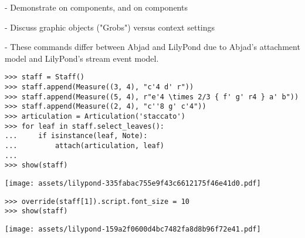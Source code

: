 -   Demonstrate on components, and on components

-   Discuss graphic objects ("Grobs") versus context settings

-   These commands differ between Abjad and LilyPond due to Abjad's attachment
    model and LilyPond's stream event model.

\begin{comment}
<abjad>
staff = Staff()
staff.append(Measure((3, 4), "c'4 d' r"))
staff.append(Measure((5, 4), r"e'4 \times 2/3 { f' g' r4 } a' b"))
staff.append(Measure((2, 4), "c''8 g' c'4"))
articulation = Articulation('staccato')
for leaf in staff.select_leaves():
    if isinstance(leaf, Note):
        attach(articulation, leaf)

show(staff)
</abjad>
\end{comment}

\begin{abjadbookoutput}
\begin{singlespacing}
\vspace{-0.5\baselineskip}
\begin{lstlisting}
>>> staff = Staff()
>>> staff.append(Measure((3, 4), "c'4 d' r"))
>>> staff.append(Measure((5, 4), r"e'4 \times 2/3 { f' g' r4 } a' b"))
>>> staff.append(Measure((2, 4), "c''8 g' c'4"))
>>> articulation = Articulation('staccato')
>>> for leaf in staff.select_leaves():
...     if isinstance(leaf, Note):
...         attach(articulation, leaf)
...
>>> show(staff)
\end{lstlisting}
\noindent\texttt{[image: assets/lilypond-335fabac755e9f43c6612175f46e41d0.pdf]}
\end{singlespacing}
\end{abjadbookoutput}

\begin{comment}
<abjad>
override(staff[1]).script.font_size = 10
show(staff)
</abjad>
\end{comment}

\begin{abjadbookoutput}
\begin{singlespacing}
\vspace{-0.5\baselineskip}
\begin{lstlisting}
>>> override(staff[1]).script.font_size = 10
>>> show(staff)
\end{lstlisting}
\noindent\texttt{[image: assets/lilypond-159a2f0600d4bc7482fa8d8b96f72e41.pdf]}
\end{singlespacing}
\end{abjadbookoutput}

